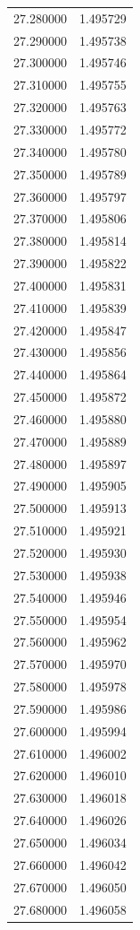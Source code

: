 \begin{tabular}{rr}
27.280000 & 1.495729 \\
27.290000 & 1.495738 \\
27.300000 & 1.495746 \\
27.310000 & 1.495755 \\
27.320000 & 1.495763 \\
27.330000 & 1.495772 \\
27.340000 & 1.495780 \\
27.350000 & 1.495789 \\
27.360000 & 1.495797 \\
27.370000 & 1.495806 \\
27.380000 & 1.495814 \\
27.390000 & 1.495822 \\
27.400000 & 1.495831 \\
27.410000 & 1.495839 \\
27.420000 & 1.495847 \\
27.430000 & 1.495856 \\
27.440000 & 1.495864 \\
27.450000 & 1.495872 \\
27.460000 & 1.495880 \\
27.470000 & 1.495889 \\
27.480000 & 1.495897 \\
27.490000 & 1.495905 \\
27.500000 & 1.495913 \\
27.510000 & 1.495921 \\
27.520000 & 1.495930 \\
27.530000 & 1.495938 \\
27.540000 & 1.495946 \\
27.550000 & 1.495954 \\
27.560000 & 1.495962 \\
27.570000 & 1.495970 \\
27.580000 & 1.495978 \\
27.590000 & 1.495986 \\
27.600000 & 1.495994 \\
27.610000 & 1.496002 \\
27.620000 & 1.496010 \\
27.630000 & 1.496018 \\
27.640000 & 1.496026 \\
27.650000 & 1.496034 \\
27.660000 & 1.496042 \\
27.670000 & 1.496050 \\
27.680000 & 1.496058 \\

\end{tabular}
